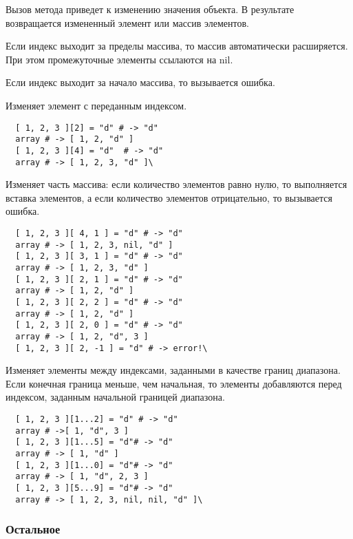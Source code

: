 Вызов метода приведет к изменению значения объекта. В результате возвращается измененный элемент или массив элементов. 

Если индекс выходит за пределы массива, то массив автоматически расширяется. При этом промежуточные элементы ссылаются на nil. 

Если индекс выходит за начало массива, то вызывается ошибка. 

\begin{methodlist}
  Изменяет элемент с переданным индексом. 
  \begin{verbatim}
  [ 1, 2, 3 ][2] = "d" # -> "d" 
  array # -> [ 1, 2, "d" ] 
  [ 1, 2, 3 ][4] = "d"  # -> "d" 
  array # -> [ 1, 2, 3, "d" ]\
  \end{verbatim}

  Изменяет часть массива: если количество элементов равно нулю, то выполняется вставка элементов, а если количество элементов отрицательно, то вызывается ошибка.
  \begin{verbatim}
  [ 1, 2, 3 ][ 4, 1 ] = "d" # -> "d" 
  array # -> [ 1, 2, 3, nil, "d" ] 
  [ 1, 2, 3 ][ 3, 1 ] = "d" # -> "d" 
  array # -> [ 1, 2, 3, "d" ] 
  [ 1, 2, 3 ][ 2, 1 ] = "d" # -> "d" 
  array # -> [ 1, 2, "d" ] 
  [ 1, 2, 3 ][ 2, 2 ] = "d" # -> "d" 
  array # -> [ 1, 2, "d" ] 
  [ 1, 2, 3 ][ 2, 0 ] = "d" # -> "d" 
  array # -> [ 1, 2, "d", 3 ] 
  [ 1, 2, 3 ][ 2, -1 ] = "d" # -> error!\
  \end{verbatim}

  Изменяет элементы между индексами, заданными в качестве границ диапазона. 
  Если конечная граница меньше, чем начальная, то элементы добавляются перед индексом, заданным начальной границей диапазона.
  \begin{verbatim}
  [ 1, 2, 3 ][1...2] = "d" # -> "d" 
  array # ->[ 1, "d", 3 ] 
  [ 1, 2, 3 ][1...5] = "d"# -> "d" 
  array # -> [ 1, "d" ] 
  [ 1, 2, 3 ][1...0] = "d"# -> "d" 
  array # -> [ 1, "d", 2, 3 ] 
  [ 1, 2, 3 ][5...9] = "d"# -> "d" 
  array # -> [ 1, 2, 3, nil, nil, "d" ]\
  \end{verbatim}
\end{methodlist}

\subsubsection*{Остальное}

